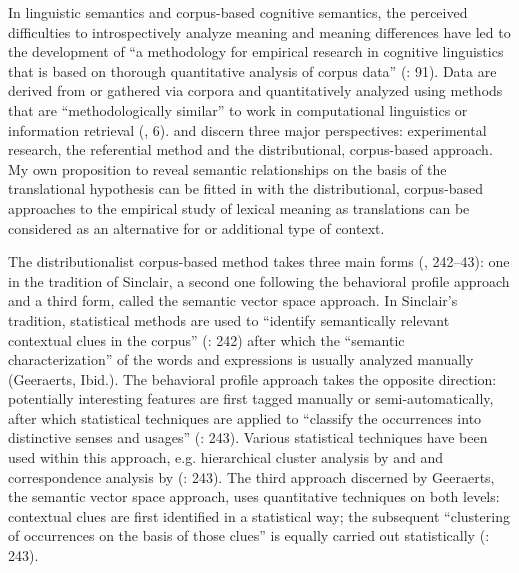 In linguistic semantics and corpus-based cognitive semantics, the perceived difficulties to introspectively analyze meaning and meaning differences have led to the development of “a methodology for empirical research in cognitive linguistics that is based on thorough quantitative analysis of corpus data” (\citealt{kristiansen_methodological_2008}: 91). Data are derived from or gathered via corpora and quantitatively analyzed using methods that are “methodologically similar” to work in computational linguistics or information retrieval (\citealt{gries_introduction_2006}, 6). \citet[242]{riemer_sense_2016} and \citet{glynn_empirical_2010} discern three major perspectives: experimental research, the referential method and the distributional, corpus-based approach. My own proposition to reveal semantic relationships on the basis of the translational hypothesis can be fitted in with the distributional, corpus-based approaches to the empirical study of lexical meaning as translations can be considered as an alternative for or additional type of context.



The distributionalist corpus-based method takes three main forms (\citealt{riemer_sense_2016}, 242–43): one in the tradition of Sinclair, a second one following the behavioral profile approach and a third form, called the semantic vector space approach. In Sinclair’s tradition, statistical methods are used to “identify semantically relevant contextual clues in the corpus” (\citealt{riemer_sense_2016}: 242) after which the “semantic characterization” of the words and expressions is usually analyzed manually (Geeraerts, Ibid.). The behavioral profile approach takes the opposite direction: potentially interesting features are first tagged manually or semi-automatically, after which statistical techniques are applied to “classify the occurrences into distinctive senses and usages” (\citealt{riemer_sense_2016}: 243). Various statistical techniques have been used within this approach, e.g. hierarchical cluster analysis by  \citet{Gries2006b} and \citet{divjak_structuring_2010} and correspondence analysis by \citet{glynn_empirical_2010} (\citealt{riemer_sense_2016}: 243). The third approach discerned by Geeraerts, the semantic vector space approach, uses quantitative techniques on both levels: contextual clues are first identified in a statistical way; the subsequent “clustering of occurrences on the basis of those clues” is equally carried out statistically (\citealt{riemer_sense_2016}: 243).



